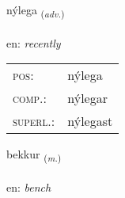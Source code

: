 \documentclass[frontgrid, backgrid]{flacards}\usepackage[]{graphicx}\usepackage[]{color}
\begin{document}
\renewcommand{\flhead}{\vskip5pt \fboxsep=0pt {\small\bfseries\footnotesize Atviksorð | Adverb}}
\renewcommand{\fcfoot}{\vskip5pt \fboxsep=0pt \hspace{2pt}{\small\bfseries\footnotesize 2K}}

\renewcommand{\blhead}{\vskip5pt {\small\bfseries\footnotesize Atviksorð | Adverb }}
\renewcommand{\bcfoot}{\vskip5pt \hspace{2pt}{\small\bfseries\footnotesize 2K}}


{nýlega \small{\textsubscript{(\textit{adv.})}} \\[1ex] %
\textphonetic{[niːlɛɣa]} \\
en: \emph{recently} \\  [2ex]
\renewcommand*{\arraystretch}{0.8}
\begin{tabular}{ll}
\textsc{pos}: & nýlega \\ 
\textsc{comp.}: & nýlegar \\ 
\textsc{superl.}: & nýlegast \\
\end{tabular}
}

\renewcommand{\flhead}{\vskip5pt \fboxsep=0pt {\small\bfseries\footnotesize Nafnorð | Noun}}
\renewcommand{\fcfoot}{\vskip5pt \fboxsep=0pt \hspace{2pt}{\small\bfseries\footnotesize 2K}}

\renewcommand{\blhead}{\vskip5pt {\small\bfseries\footnotesize Nafnorð | Noun }}
\renewcommand{\bcfoot}{\vskip5pt \hspace{2pt}{\small\bfseries\footnotesize 2K}}


{bekkur \small{\textsubscript{(\textit{m.})}} \\[1ex] %
\textphonetic{[pɛhkʏr]} \\
en: \emph{bench} \\  [2ex]
\renewcommand*{\arraystretch}{0.8}
}
\end{document}
